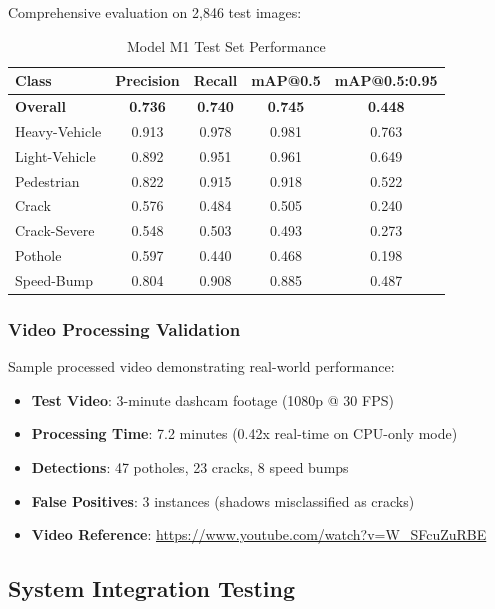 \documentclass[12pt]{article}
\begin{document}
Comprehensive evaluation on 2,846 test images:

\begin{table}[H]
    \centering
    \caption{Model M1 Test Set Performance}
    \label{tab:model-test-performance}
    \begin{tabular}{lcccc}
        \toprule
        \textbf{Class} & \textbf{Precision} & \textbf{Recall} & \textbf{mAP@0.5} & \textbf{mAP@0.5:0.95} \\
        \midrule
        \textbf{Overall} & \textbf{0.736} & \textbf{0.740} & \textbf{0.745} & \textbf{0.448} \\
        Heavy-Vehicle & 0.913 & 0.978 & 0.981 & 0.763 \\
        Light-Vehicle & 0.892 & 0.951 & 0.961 & 0.649 \\
        Pedestrian & 0.822 & 0.915 & 0.918 & 0.522 \\
        Crack & 0.576 & 0.484 & 0.505 & 0.240 \\
        Crack-Severe & 0.548 & 0.503 & 0.493 & 0.273 \\
        Pothole & 0.597 & 0.440 & 0.468 & 0.198 \\
        Speed-Bump & 0.804 & 0.908 & 0.885 & 0.487 \\
        \bottomrule
    \end{tabular}
\end{table}

\subsubsection*{Video Processing Validation}

Sample processed video demonstrating real-world performance:

\begin{itemize}
    \item \textbf{Test Video}: 3-minute dashcam footage (1080p @ 30 FPS)
    \item \textbf{Processing Time}: 7.2 minutes (0.42x real-time on CPU-only mode)
    \item \textbf{Detections}: 47 potholes, 23 cracks, 8 speed bumps
    \item \textbf{False Positives}: 3 instances (shadows misclassified as cracks)
    \item \textbf{Video Reference}: \url{https://www.youtube.com/watch?v=W_SFcuZuRBE}
\end{itemize}

\subsection{System Integration Testing}
\end{document}
